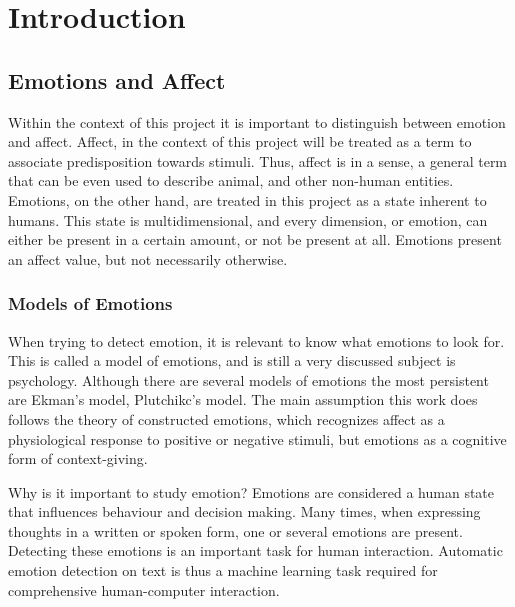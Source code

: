 \chapter{Introduction}\label{chap:Introduction}

\section{Emotions and Affect}\label{sec:Emotions and Affect}

Within the context of this project it is important to distinguish between emotion and affect. Affect, in the context of this project will be treated as a term to associate predisposition towards stimuli. Thus, affect is in a sense, a general term that can be even used to describe animal, and other non-human entities. Emotions, on the other hand, are treated in this project as a state inherent to humans. This state is multidimensional, and every dimension, or emotion, can either be present in a certain amount, or not be present at all.
Emotions present an affect value, but not necessarily otherwise.

\subsection{Models of Emotions}\label{sub:Models of Emotions}

When trying to detect emotion, it is relevant to know what emotions to look for. This is called a model of emotions, and is still a very discussed subject is psychology. Although there are several models of emotions the most persistent are Ekman’s model, Plutchikc’s model. The main assumption this work does follows the theory of constructed emotions, which recognizes affect as a physiological response to positive or negative stimuli, but emotions as a cognitive form of context-giving.

Why is it important to study emotion?
Emotions are considered a human state that influences behaviour and decision making. Many times, when expressing thoughts in a written or spoken form, one or several emotions are present. Detecting these emotions is an important task for human interaction. Automatic emotion detection on text is thus a machine learning task required for comprehensive human-computer interaction.


